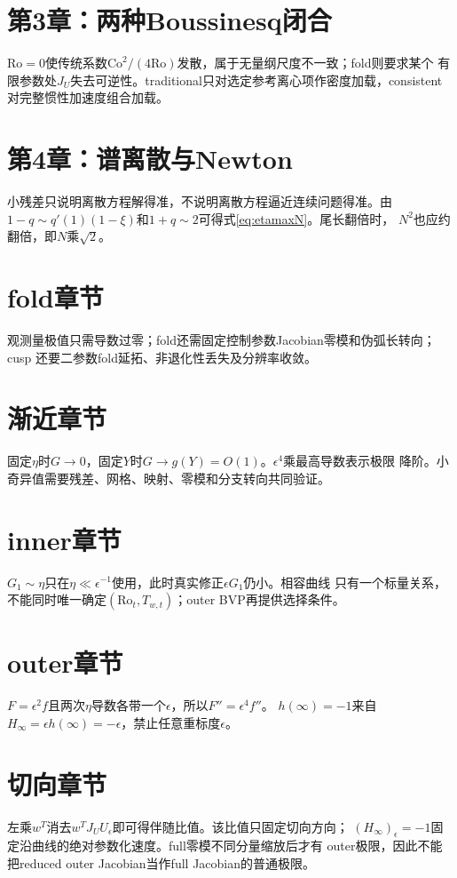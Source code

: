 \documentclass[UTF8,zihao=-4,openany]{ctexbook}
\newcommand{\eps}{\epsilon}
\newcommand{\Ro}{\mathrm{Ro}}
\newcommand{\Co}{\mathrm{Co}}
\begin{document}
\section*{第3章：两种Boussinesq闭合}
$\Ro=0$使传统系数$\Co^2/(4\Ro)$发散，属于无量纲尺度不一致；fold则要求某个
有限参数处$J_U$失去可逆性。traditional只对选定参考离心项作密度加载，consistent
对完整惯性加速度组合加载。

\section*{第4章：谱离散与Newton}
小残差只说明离散方程解得准，不说明离散方程逼近连续问题得准。由
$1-q\sim q'(1)(1-\xi)$和$1+q\sim2$可得式\eqref{eq:etamaxN}。尾长翻倍时，
$N^2$也应约翻倍，即$N$乘$\sqrt2$。

\section*{fold章节}
观测量极值只需导数过零；fold还需固定控制参数Jacobian零模和伪弧长转向；cusp
还要二参数fold延拓、非退化性丢失及分辨率收敛。

\section*{渐近章节}
固定$\eta$时$G\to0$，固定$Y$时$G\to g(Y)=O(1)$。$\eps^4$乘最高导数表示极限
降阶。小奇异值需要残差、网格、映射、零模和分支转向共同验证。

\section*{inner章节}
$G_1\sim\eta$只在$\eta\ll\eps^{-1}$使用，此时真实修正$\eps G_1$仍小。相容曲线
只有一个标量关系，不能同时唯一确定$(\Ro_t,T_{w,t})$；outer BVP再提供选择条件。

\section*{outer章节}
$F=\eps^2f$且两次$\eta$导数各带一个$\eps$，所以$F''=\eps^4f''$。
$h(\infty)=-1$来自$H_\infty=\eps h(\infty)=-\eps$，禁止任意重标度$\eps$。

\section*{切向章节}
左乘$w^T$消去$w^TJ_UU_\eps$即可得伴随比值。该比值只固定切向方向；
$(H_\infty)_\eps=-1$固定沿曲线的绝对参数化速度。full零模不同分量缩放后才有
outer极限，因此不能把reduced outer Jacobian当作full Jacobian的普通极限。
\end{document}
